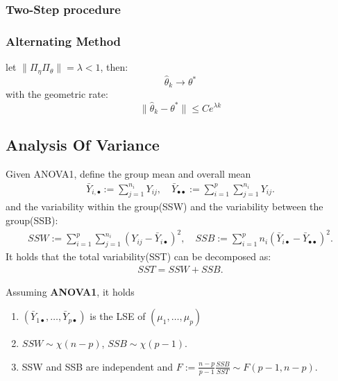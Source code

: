 \subsubsection*{Two-Step procedure}


\subsubsection*{Alternating Method}
\begin{theorem}
	let $\| \Pi_\eta \Pi_\theta\| = \lambda < 1$, then:
	\begin{equation*}
		\hat{\theta}_k \longrightarrow \theta^* 
	\end{equation*}
	with the geometric rate:
	\begin{equation*}
		\|\hat{\theta}_k - \theta^*\| \leq Ce^{\lambda k}
	\end{equation*}
\end{theorem}


\subsection{Analysis Of Variance}
\begin{definition}
\end{definition}

\begin{definition}
	Given ANOVA1, define the group mean and overall mean 
	\begin{align*}
		\bar{Y}_{i, \bullet}:= \sum_{j = 1}^{n_i} Y_{ij}, \quad \bar{Y}_{\bullet\bullet}:= \sum_{i = 1}^p \sum_{j = 1}^{n_i} Y_{ij}.
	\end{align*}
	and the variability within the group(SSW) and the variability between the group(SSB):
	\begin{align*}
		SSW:=  \sum_{i = 1}^p \sum_{j = 1}^{n_i}(Y_{ij} - \bar{Y}_{i\bullet})^2, \quad SSB:= \sum_{i = 1}^p n_i ( \bar{Y}_{i\bullet} - \bar{Y}_{\bullet\bullet})^2. 
	\end{align*}
	It holds that the total variability(SST) can be decomposed  as:
	\begin{align*}
		SST = SSW + SSB.
	\end{align*}
\end{definition}

\begin{theorem}
	Assuming \textbf{ANOVA1}, it holds
	\begin{enumerate}
		\item $(\bar{Y}_{1\bullet}, \dots, \bar{Y}_{p\bullet})$ is the LSE of $(\mu_1, \dots, \mu_p)$
		\item $SSW \sim \chi(n - p)$, $SSB \sim \chi ( p -1)$. 
		\item SSW and SSB are independent and  $F :=  \frac{n - p}{p -1} \frac{SSB}{SST} \sim F(p - 1, n - p)$. 
	\end{enumerate}
\end{theorem}




